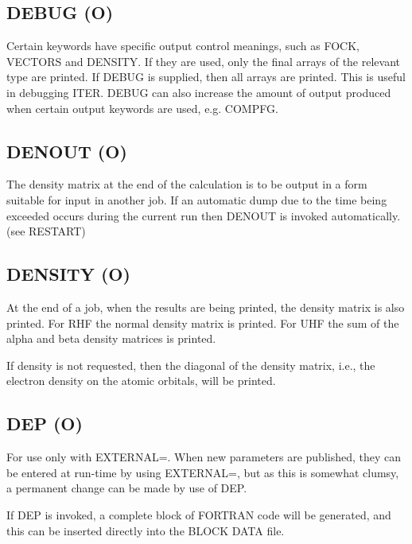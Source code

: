 \documentclass[11pt]{book}
\newcommand{\mi}[1]{#1\index{#1}}
\begin{document}
                                   
\subsection*{DEBUG (O)}
        Certain keywords have specific  output  control  meanings,  such  as
   FOCK,  VECTORS  and  DENSITY.  If they are used, only the final arrays of
   the relevant type are printed.  If DEBUG is supplied, then all arrays are
   printed.   This is useful in debugging ITER.  
   \mi{DEBUG} can also increase the
   amount of output produced when certain output  keywords  are  used,  e.g.
   COMPFG.


                                  
\subsection*{DENOUT (O)}
        The density matrix at the end of the calculation is to be output  in
   a  form  suitable  for input in another job.  If an automatic dump due to
   the time being exceeded occurs during the  current  run  then  DENOUT  is
   invoked automatically.  (see RESTART)


                                  
\subsection*{DENSITY (O)}
        At the end of a job, when the results are being printed, the density
   matrix  is  also  printed.  For RHF the normal density matrix is printed.
   For UHF the sum of the alpha and beta density matrices is printed.

        If density is not  requested,  then  the  diagonal  of  the  density
   matrix,  i.e.,  the  electron  density  on  the  atomic orbitals, will be
   printed.


\subsection*{DEP (O)}
      For use only with EXTERNAL=.  When  new  parameters  are  published,
 they  can  be  entered  at  run-time  by  using EXTERNAL=, but as this is
 somewhat clumsy, a permanent change can be made by use of DEP.

      If DEP is  invoked,  a  complete  block  of  FORTRAN  code  will  be
 generated, and this can be inserted directly into the BLOCK DATA file.
 
\end{document}
